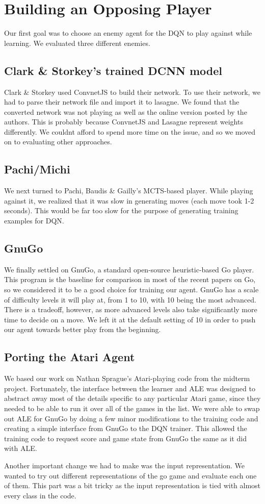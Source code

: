 \section{Building an Opposing Player}
Our first goal was to choose an enemy agent for the DQN to play against while learning. We evaluated three different enemies.
\subsection{Clark \& Storkey's trained DCNN model}
Clark \& Storkey used ConvnetJS to build their network. To use their network, we had to parse their network file and import it to lasagne. We found that the converted network was not playing as well as the online version posted by the authors. This is probably because ConvnetJS and Lasagne represent weights differently. We couldnt afford to spend more time on the issue, and so we moved on to evaluating other approaches.
\subsection{Pachi/Michi}
We next turned to Pachi, Baudis \& Gailly's MCTS-based player. While playing against it, we realized that it was slow in generating moves (each move took 1-2 seconds). This would be far too slow for the purpose of generating training examples for DQN.
\subsection{GnuGo}
We finally settled on GnuGo, a standard open-source heuristic-based Go player. This program is the baseline for comparison in most of the recent papers on Go, so we considered it to be a good choice for training our agent. GnuGo has a scale of difficulty levels it will play at, from 1 to 10, with 10 being the most advanced. There is a tradeoff, however, as more advanced levels also take significantly more time to decide on a move. We left it at the default setting of 10 in order to push our agent towards better play from the beginning.
\subsection*{Porting the Atari Agent}
We based our work on Nathan Sprague's Atari-playing code from the midterm project. Fortunately, the interface between the learner and ALE was designed to abstract away most of the details specific to any particular Atari game, since they needed to be able to run it over all of the games in the list. We were able to swap out ALE for GnuGo by doing a few minor modifications to the training code and creating a simple interface from GnuGo to the DQN trainer. This allowed the training code to request score and game state from GnuGo the same as it did with ALE.

Another important change we had to make was the input representation. We wanted to try out different representations of the go game and evaluate each one of them. This part was a bit tricky as the input representation is tied with almost every class in the code.
